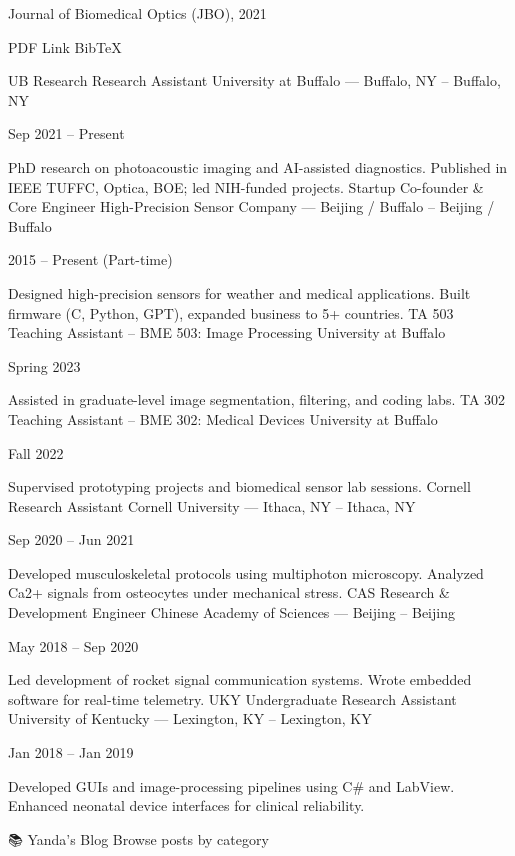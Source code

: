 Journal of Biomedical Optics (JBO), 2021

PDF Link BibTeX


UB Research
Research Assistant
University at Buffalo — Buffalo, NY – Buffalo, NY

Sep 2021 – Present

PhD research on photoacoustic imaging and AI-assisted diagnostics.
Published in IEEE TUFFC, Optica, BOE; led NIH-funded projects.
Startup
Co-founder & Core Engineer
High-Precision Sensor Company — Beijing / Buffalo – Beijing / Buffalo

2015 – Present (Part-time)

Designed high-precision sensors for weather and medical applications.
Built firmware (C, Python, GPT), expanded business to 5+ countries.
TA 503
Teaching Assistant – BME 503: Image Processing
University at Buffalo

Spring 2023

Assisted in graduate-level image segmentation, filtering, and coding labs.
TA 302
Teaching Assistant – BME 302: Medical Devices
University at Buffalo

Fall 2022

Supervised prototyping projects and biomedical sensor lab sessions.
Cornell
Research Assistant
Cornell University — Ithaca, NY – Ithaca, NY

Sep 2020 – Jun 2021

Developed musculoskeletal protocols using multiphoton microscopy.
Analyzed Ca2+ signals from osteocytes under mechanical stress.
CAS
Research & Development Engineer
Chinese Academy of Sciences — Beijing – Beijing

May 2018 – Sep 2020

Led development of rocket signal communication systems.
Wrote embedded software for real-time telemetry.
UKY
Undergraduate Research Assistant
University of Kentucky — Lexington, KY – Lexington, KY

Jan 2018 – Jan 2019

Developed GUIs and image-processing pipelines using C# and LabView.
Enhanced neonatal device interfaces for clinical reliability.

📚 Yanda's Blog
Browse posts by category

